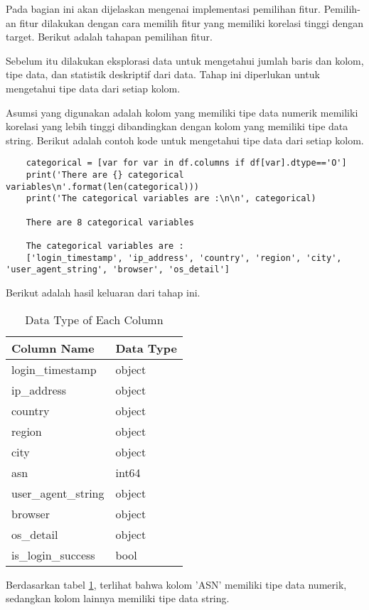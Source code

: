 Pada bagian ini akan dijelaskan mengenai implementasi pemilihan fitur. Pemilih-
an fitur dilakukan dengan cara memilih fitur yang memiliki korelasi tinggi dengan target.
Berikut adalah tahapan pemilihan fitur.

Sebelum itu dilakukan eksplorasi data untuk mengetahui jumlah baris dan kolom, tipe data, dan statistik deskriptif dari data. 
Tahap ini diperlukan untuk mengetahui tipe data dari setiap kolom. 

Asumsi yang digunakan adalah kolom yang memiliki tipe data numerik memiliki korelasi yang lebih tinggi dibandingkan dengan kolom yang memiliki tipe data string.
Berikut adalah contoh kode untuk mengetahui tipe data dari setiap kolom.

\begin{lstlisting}
    categorical = [var for var in df.columns if df[var].dtype=='O']
    print('There are {} categorical variables\n'.format(len(categorical)))
    print('The categorical variables are :\n\n', categorical)

    There are 8 categorical variables

    The categorical variables are :
    ['login_timestamp', 'ip_address', 'country', 'region', 'city', 'user_agent_string', 'browser', 'os_detail']
    \end{lstlisting}

    Berikut adalah hasil keluaran dari tahap ini.

    \begin{table}[H]
        \caption{Data Type of Each Column}
        \centering
        \begin{tabular}{|l|l|}
        \hline
        \textbf{Column Name} & \textbf{Data Type} \\ \hline
        login\_timestamp & object \\ 
        ip\_address & object \\ 
        country & object \\ 
        region & object \\ 
        city & object \\ 
        asn & int64 \\ 
        user\_agent\_string & object \\ 
        browser & object \\ 
        os\_detail & object \\ 
        is\_login\_success & bool \\ \hline
        \end{tabular}
        \label{tab:data_type}
        \end{table}

        Berdasarkan tabel \ref{tab:data_type}, terlihat bahwa kolom 'ASN' memiliki tipe data numerik, sedangkan kolom lainnya memiliki tipe data string.

